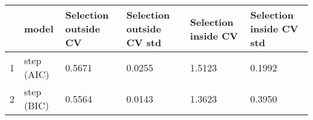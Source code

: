 \begin{tabular}{c|p{2cm}|p{2cm}|p{2cm}|p{2cm}|p{2cm}}
\toprule
{} &       model &  Selection outside CV &  Selection outside CV std &  Selection inside CV &  Selection inside CV std \\
\midrule
1 &  step (AIC) &                0.5671 &                    0.0255 &               1.5123 &                   0.1992 \\
2 &  step (BIC) &                0.5564 &                    0.0143 &               1.3623 &                   0.3950 \\
\bottomrule
\end{tabular}
